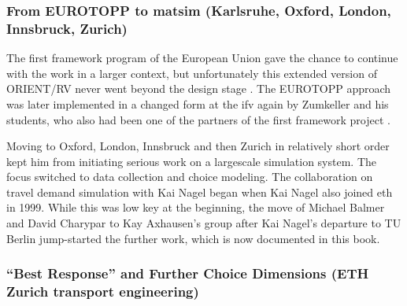 \subsubsection{From EUROTOPP to \gls{matsim} (Karlsruhe, Oxford, London, Innsbruck, Zurich)}


The  first framework program of the European Union gave the chance to continue with the work in a larger context, but unfortunately this extended version of ORIENT/RV never went beyond the design stage \citep[][]{AxhausenGoodwin1991}. The EUROTOPP approach was later implemented in a changed form at the \gls{ifv} again by Zumkeller and his students, who also had been one of the partners of the first framework project \citep[][]{SchnittgerZumkeller_ETC_2004}.

Moving to Oxford, London, Innsbruck and then Zurich in relatively short order kept him from initiating serious work on a \gls{largescale} simulation system. 
The focus switched to data collection and choice modeling. 
The collaboration on travel demand simulation with Kai Nagel began when Kai Nagel also joined \gls{eth} in 1999. 
While this was low key at the beginning, the move of Michael Balmer and David Charypar to Kay Axhausen's group after Kai Nagel's departure to TU Berlin jump-started the further work, which is now documented in %
this book.


\subsubsection{``Best Response'' and Further Choice Dimensions (ETH Zurich transport engineering)}


